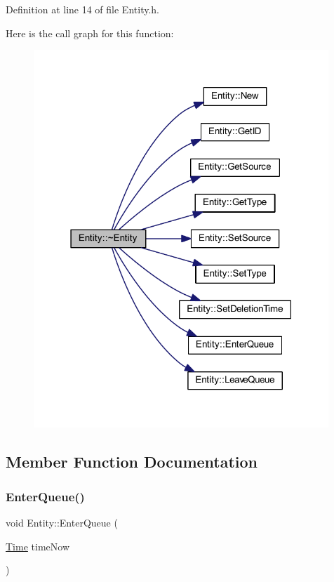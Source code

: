 Definition at line 14 of file Entity.\+h.

Here is the call graph for this function\+:
\nopagebreak
\begin{figure}[H]
\begin{center}
\leavevmode
\includegraphics[width=315pt]{class_entity_adf6d3f7cb1b2ba029b6b048a395cc8ae_cgraph}
\end{center}
\end{figure}


\subsection{Member Function Documentation}
\mbox{\label{class_entity_a957592ba81c76d59f622a887fee36e8d}} 
\subsubsection{\texorpdfstring{Enter\+Queue()}{EnterQueue()}}
{\footnotesize\ttfamily void Entity\+::\+Enter\+Queue (\begin{DoxyParamCaption}\item[{\hyperlink{_simulation_executive_8h_ac2d3e0ba793497bcca555c7c2cf64ff3}{Time}}]{time\+Now }\end{DoxyParamCaption})}



